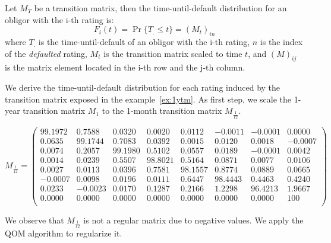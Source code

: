 \documentclass[11pt,fleqn]{book} %
\begin{document}
\begin{proposition}
	\label{prop:pdftm}
	Let $M_T$ be a transition matrix, then the time-until-default distribution 
	for an obligor with the i-th rating is:
	\begin{displaymath}
		F_i(t) = \Pr\{T_. \le t\} = \left( M_t \right)_{in}
	\end{displaymath}
	where $T_.$ is the time-until-default of an obligor with the i-th rating, 
	$n$ is the index of the \emph{defaulted} rating, $M_t$ is the transition 
	matrix scaled to time $t$, and $(M)_{ij}$ is the matrix element located in 
	the i-th row and the j-th column.
\end{proposition}

\begin{example}
	\label{ex:pdftm}
	We derive the time-until-default distribution for each rating induced by the 
	transition matrix exposed in the example~\ref{ex:1ytm}. As first step, we scale 
	the 1-year transition matrix $M_1$ to the 1-month transition matrix 
	$M_{\frac{1}{12}}$.
	{\small
	\begin{displaymath}
		M_{\frac{1}{12}} = \left(
		\begin{array}{cccccccc}
			99.1972 &  0.7588 &  0.0320 &  0.0020 &  0.0112 & -0.0011 & -0.0001 &   0.0000 \\
			 0.0635 & 99.1744 &  0.7083 &  0.0392 &  0.0015 &  0.0120 &  0.0018 &  -0.0007 \\
			 0.0074 &  0.2057 & 99.1980 &  0.5102 &  0.0557 &  0.0189 & -0.0001 &   0.0042 \\
			 0.0014 &  0.0239 &  0.5507 & 98.8021 &  0.5164 &  0.0871 &  0.0077 &   0.0106 \\
			 0.0027 &  0.0113 &  0.0396 &  0.7581 & 98.1557 &  0.8774 &  0.0889 &   0.0665 \\
			-0.0007 &  0.0098 &  0.0196 &  0.0111 &  0.6447 & 98.4443 &  0.4463 &   0.4240 \\
			 0.0233 & -0.0023 &  0.0170 &  0.1287 &  0.2166 &  1.2298 & 96.4213 &   1.9667 \\
			 0.0000 &  0.0000 &  0.0000 &  0.0000 &  0.0000 &  0.0000 &  0.0000 & 100 \\
		\end{array}
		\right)
	\end{displaymath}\par}
	We observe that $M_{\frac{1}{12}}$ is not a regular matrix due to negative
	values. We apply the QOM algorithm to regularize it.
	{\small
	\begin{displaymath}

\end{displaymath}}
\end{example}
\end{document}
